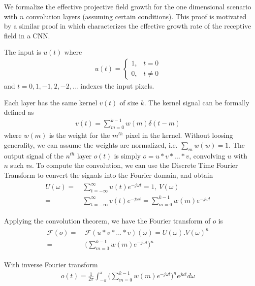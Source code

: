 We formalize the effective projective field growth for the one dimensional scenario with $n$ convolution layers (assuming certain conditions). This proof is motivated by a similar proof in \cite{luo2016understanding} which characterizes the effective growth rate of the receptive field in a CNN.

The input is $u(t)$ where
\begin{align}
	u(t) = 
	\begin{cases}
		1, & t = 0\\
		0, & t \neq 0 
	\end{cases}
\end{align}
and $t = 0, 1, -1, 2, -2, ...$ indexes the input pixels.

Each layer has the same kernel $v(t)$ of size $k$. The kernel signal can be formally defined as
\begin{align}
	v(t) = \sum_{m=0}^{k-1} w(m)\delta(t-m)
\end{align}
where $w(m)$ is the weight for the $m^{th}$ pixel in the kernel.
Without loosing generality, we can assume the weights are normalized, i.e. $\sum_{m}w(w)=1$. The output signal of the $n^{th}$ layer $o(t)$ is simply $o = u * v * ... * v$, convolving $u$ with $n$ such $v$s.
To compute the convolution, we can use the Discrete Time Fourier Transform to convert the signals into the Fourier domain, and obtain
\begin{align}
\begin{split}
	U(\omega) =&~ \sum_{t=-\infty}^{\infty} u(t)e^{-j\omega t} = 1, ~V(\omega) \\=&~ \sum_{t=-\infty}^{\infty} v(t)e^{-j\omega t} = \sum_{m=0}^{k-1} w(m)e^{-j\omega t}
\end{split}
\end{align}

Applying the convolution theorem, we have the Fourier transform of $o$ is
\begin{align}
\begin{split}
	\mathcal{F}(o) =&~ \mathcal{F}(u*v*...*v)(\omega) = U(\omega) . V(\omega)^n \\=&~ \Bigg(\sum_{m=0}^{k-1}w(m)e^{-j\omega t}\Bigg)^n
\end{split}
\end{align}

With inverse Fourier transform
\begin{align}
	o(t) = \frac{1}{2\pi}\int_{-\pi}^{\pi}\Big(\sum_{m=0}^{k-1}w(m)e^{-j\omega t}\Big)^ne^{j\omega t} d\omega
\end{align}

